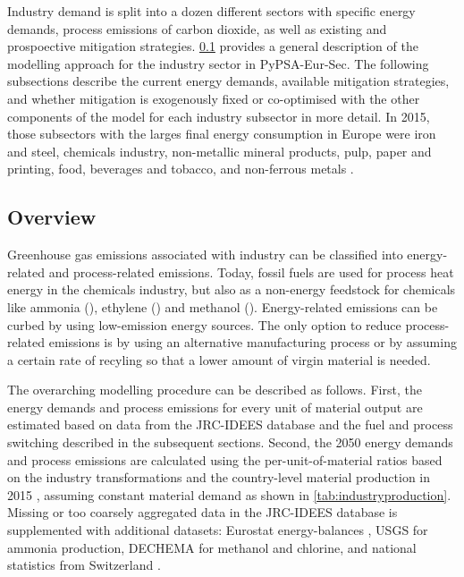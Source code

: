 Industry demand is split into a dozen different sectors with specific energy
demands, process emissions of carbon dioxide, as well as existing and
prospoective mitigation strategies. \cref{sec:si:industry:overview} provides a
general description of the modelling approach for the industry sector in
PyPSA-Eur-Sec. The following subsections describe the current energy demands,
available mitigation strategies, and whether mitigation is exogenously fixed or
co-optimised with the other components of the model for each industry subsector
in more detail. In 2015, those subsectors with the larges final energy
consumption in Europe were iron and steel, chemicals industry, non-metallic
mineral products, pulp, paper and printing, food, beverages and tobacco, and
non-ferrous metals .

\subsection{Overview}
\label{sec:si:industry:overview}

Greenhouse gas emissions associated with industry can be classified into
energy-related and process-related emissions. Today, fossil fuels are used for
process heat energy in the chemicals industry, but also as a non-energy
feedstock for chemicals like ammonia (), ethylene () and
methanol (). Energy-related emissions can be curbed by using
low-emission energy sources. The only option to reduce process-related emissions
is by using an alternative manufacturing process or by assuming a certain rate
of recyling so that a lower amount of virgin material is needed.

The overarching modelling procedure can be described as follows. First, the
energy demands and process emissions for every unit of material output are
estimated based on data from the JRC-IDEES database  and the fuel
and process switching described in the subsequent sections. Second, the 2050
energy demands and process emissions are calculated using the
per-unit-of-material ratios based on the industry transformations and the
country-level material production in 2015 , assuming constant
material demand as shown in \cref{tab:industryproduction}. Missing or too
coarsely aggregated data in the JRC-IDEES database  is supplemented
with additional datasets: Eurostat energy-balances \citeS{}, USGS 
for ammonia production, DECHEMA  for methanol
and chlorine, and national statistics from Switzerland \citeS{}.

